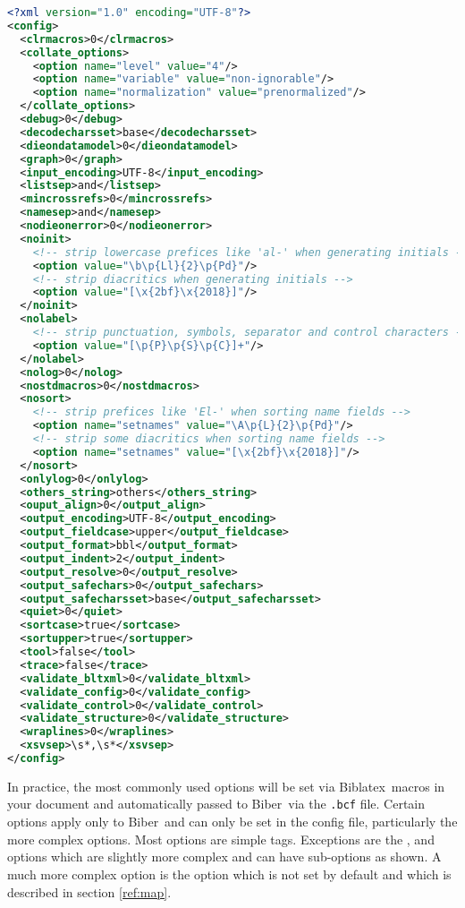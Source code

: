 \documentclass{ltxdockit}
\newcommand*{\biber}{Biber\xspace}
\newcommand*{\biblatex}{Biblatex\xspace}
\begin{document}
\begin{lstlisting}[language=xml]
<?xml version="1.0" encoding="UTF-8"?>
<config>
  <clrmacros>0</clrmacros>
  <collate_options>
    <option name="level" value="4"/>
    <option name="variable" value="non-ignorable"/>
    <option name="normalization" value="prenormalized"/>
  </collate_options>
  <debug>0</debug>
  <decodecharsset>base</decodecharsset>
  <dieondatamodel>0</dieondatamodel>
  <graph>0</graph>
  <input_encoding>UTF-8</input_encoding>
  <listsep>and</listsep>
  <mincrossrefs>0</mincrossrefs>
  <namesep>and</namesep>
  <nodieonerror>0</nodieonerror>
  <noinit>
    <!-- strip lowercase prefices like 'al-' when generating initials -->
    <option value="\b\p{Ll}{2}\p{Pd}"/>
    <!-- strip diacritics when generating initials -->
    <option value="[\x{2bf}\x{2018}]"/>
  </noinit>
  <nolabel>
    <!-- strip punctuation, symbols, separator and control characters -->
    <option value="[\p{P}\p{S}\p{C}]+"/> 
  </nolabel>
  <nolog>0</nolog>
  <nostdmacros>0</nostdmacros>
  <nosort>
    <!-- strip prefices like 'El-' when sorting name fields -->
    <option name="setnames" value="\A\p{L}{2}\p{Pd}"/>
    <!-- strip some diacritics when sorting name fields -->
    <option name="setnames" value="[\x{2bf}\x{2018}]"/>
  </nosort>
  <onlylog>0</onlylog>
  <others_string>others</others_string>
  <ouput_align>0</output_align>
  <output_encoding>UTF-8</output_encoding>
  <output_fieldcase>upper</output_fieldcase>
  <output_format>bbl</output_format>
  <output_indent>2</output_indent>
  <output_resolve>0</output_resolve>
  <output_safechars>0</output_safechars>
  <output_safecharsset>base</output_safecharsset>
  <quiet>0</quiet>
  <sortcase>true</sortcase>
  <sortupper>true</sortupper>
  <tool>false</tool>
  <trace>false</trace>
  <validate_bltxml>0</validate_bltxml>
  <validate_config>0</validate_config>
  <validate_control>0</validate_control>
  <validate_structure>0</validate_structure>
  <wraplines>0</wraplines>
  <xsvsep>\s*,\s*</xsvsep>
</config>
\end{lstlisting}

\noindent In practice, the most commonly used options will be set via
\biblatex\ macros in your document and automatically passed to \biber\
via the \verb+.bcf+ file. Certain options apply only to \biber\ and can
only be set in the config file, particularly the more complex
options. Most options are simple tags. Exceptions are the
,  and  options which are slightly
more complex and can have sub-options as shown. A much more complex
option is the \opt{sourcemap} option which is not set by default and
which is described in section \ref{ref:map}.
\end{document}

